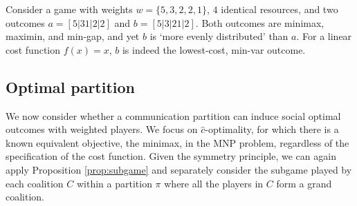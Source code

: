 \begin{example}
    Consider a game with weights $w = \{5, 3, 2, 2, 1\}$, $4$ identical resources, and two outcomes $a = [5|31|2|2]$ and $b = [5|3|21|2]$. Both outcomes are minimax, maximin, and min-gap, and yet $b$ is `more evenly distributed' than $a$. For a linear cost function $f(x) = x$, $b$ is indeed the lowest-cost, min-var outcome. 
\end{example}



\subsection{Optimal partition}

We now consider whether a communication partition can induce social optimal outcomes with weighted players. We focus on $\hat c$-optimality, for which there is a known equivalent objective, the minimax, in the MNP problem, regardless of the specification of the cost function. Given the symmetry principle, we can again apply Proposition \ref{prop:subgame} and separately consider the subgame played by each coalition $C$ within a partition $\pi$ where all the players in $C$ form a grand coalition.


